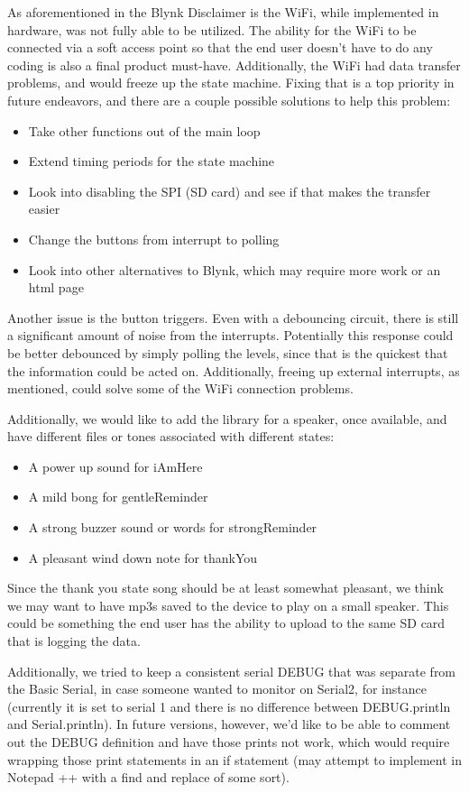 \documentclass{article}
\begin{document}
As aforementioned in the Blynk Disclaimer is the WiFi, while implemented in hardware, was not fully able to be utilized. The ability for the WiFi to be connected via a soft access point so that the end user doesn't have to do any coding is also a final product must-have. Additionally, the WiFi had data transfer problems, and would freeze up the state machine. Fixing that is a top priority in future endeavors, and there are a couple possible solutions to help this problem:
\begin{itemize}
	\item Take other functions out of the main loop
	\item Extend timing periods for the state machine
	\item Look into disabling the SPI (SD card) and see if that makes the transfer easier
	\item Change the buttons from interrupt to polling
	\item Look into other alternatives to Blynk, which may require more work or an html page
\end{itemize}

Another issue is the button triggers. Even with a debouncing circuit, there is still a significant amount of noise from the interrupts. Potentially this response could be better debounced by simply polling the levels, since that is the quickest that the information could be acted on. Additionally, freeing up external interrupts, as mentioned, could solve some of the WiFi connection problems. 

Additionally, we would like to add the library for a speaker, once available, and have different files or tones associated with different states:
\begin{itemize}
	\item A power up sound for iAmHere
	\item A mild bong for gentleReminder
	\item A strong buzzer sound or words for strongReminder
	\item A pleasant wind down note for thankYou
\end{itemize}

Since the thank you state song should be at least somewhat pleasant, we think we may want to have mp3s saved to the device to play on a small speaker. This could be something the end user has the ability to upload to the same SD card that is logging the data. 

Additionally, we tried to keep a consistent serial DEBUG that was separate from the Basic Serial, in case someone wanted to monitor on Serial2, for instance (currently it is set to serial 1 and there is no difference between DEBUG.println and Serial.println). In future versions, however, we'd like to be able to comment out the DEBUG definition and have those prints not work, which would require wrapping those print statements in an if statement (may attempt to implement in Notepad ++ with a find and replace of some sort).
\end{document}
